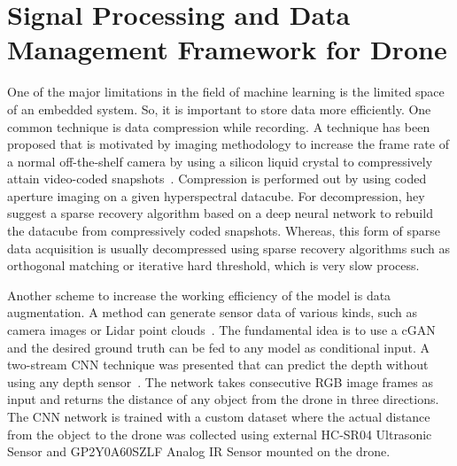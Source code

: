 \section{Signal Processing and Data Management Framework for Drone}
\label{signalprocessingsection}
One of the major limitations in the field of machine learning is the limited space of an embedded system. So, it is important to store data more efficiently. One common technique is data compression while recording. 
A technique has been proposed that is motivated by \cite{hitomi2011video} imaging methodology to increase the frame rate of a normal off-the-shelf camera by using a silicon liquid crystal to compressively attain video-coded snapshots~\cite{kumar2018onboard}. Compression is performed out by using coded aperture imaging on a given hyperspectral datacube. For decompression, hey suggest a sparse recovery algorithm based on a deep neural network to rebuild the datacube from compressively coded snapshots. Whereas, this form of sparse data acquisition is usually decompressed using  sparse recovery algorithms such as orthogonal matching or iterative hard threshold, which is very slow process.

Another scheme to increase the working efficiency of the model is data augmentation. A method can generate sensor data of various kinds, such as camera images or Lidar point clouds~\cite{milz2018aerial}. The fundamental idea is to use a cGAN and the desired ground truth can be fed to any model as conditional input.
A two-stream CNN technique was presented that can predict the depth without using any depth sensor~\cite{kouris2018learning}. The network takes consecutive RGB image frames as input and returns the distance of any object from the drone in three directions. The CNN network is trained with a custom dataset where the actual distance from the object to the drone was collected using external HC-SR04 Ultrasonic Sensor and GP2Y0A60SZLF Analog IR Sensor mounted on the drone.